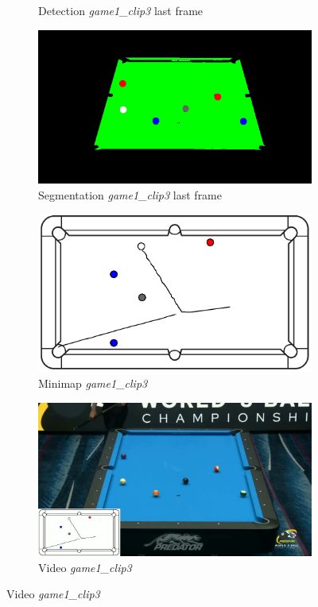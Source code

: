\begin{figure}[H]
\begin{subfigure}[b]{0.48\textwidth}
		\caption{Detection \textit{game1\_clip3} last frame}
		\label{fig: game1_clip3_last_frame_detected}
	\end{subfigure}
	\begin{subfigure}[b]{0.48\textwidth}
		\centering
		\includegraphics[width=\textwidth]{images/Segmentation/game1_clip3_segmented_balls_last_frame.jpg}
		\caption{Segmentation \textit{game1\_clip3} last frame}
		\label{fig: game1_clip3_last_frame_segmented}
	\end{subfigure}
	\begin{subfigure}[b]{0.48\textwidth}
		\centering
		\includegraphics[width=\textwidth]{images/AllMinimap/game1_clip3_minimap.png}
		\caption{Minimap \textit{game1\_clip3}}
		\label{fig: game1_clip3_minimap}
	\end{subfigure}
	\begin{subfigure}[b]{0.48\textwidth}
		\centering
		\includegraphics[width=\textwidth]{images/Video/game1_clip3_video.jpg}
		\caption{Video \textit{game1\_clip3}}
		\label{fig: game1_clip3_video}
	\end{subfigure}


\end{figure}
